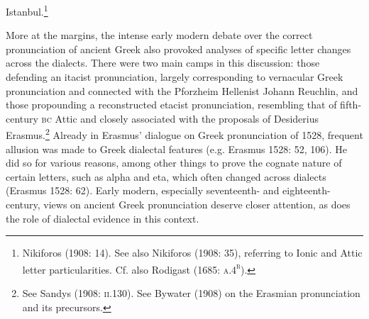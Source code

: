 \documentclass[12pt]{article}
\newenvironment{styleStandard}{\renewcommand\baselinestretch{1.25}\setlength\leftskip{0in}\setlength\rightskip{0in}\setlength\parindent{0.1972in}\setlength\parfillskip{0pt plus 1fil}\setlength\parskip{0in plus 1pt}\writerlistparindent\writerlistleftskip\leavevmode\normalfont\normalsize\writerlistlabel\ignorespaces}{\unskip\vspace{0in plus 1pt}\par}
\newcommand\writerlistleftskip{}
\newcommand\writerlistparindent{}
\newcommand\writerlistlabel{}
\begin{document}
\begin{styleStandard}
Istanbul.\footnote{\textrm{ Nikiforos (1908: 14). See also Nikiforos (1908: 35), referring to Ionic and Attic letter particularities. Cf. }also Rodigast (1685: \textsc{a.4}\textsc{\textsuperscript{r}}).}
\end{styleStandard}

\begin{styleStandard}
More at the margins, the intense early modern debate over the correct pronunciation of ancient Greek also provoked analyses of specific letter changes across the dialects. There were two main camps in this discussion: those defending an itacist pronunciation, largely corresponding to vernacular Greek pronunciation and connected with the Pforzheim Hellenist Johann Reuchlin, and those propounding a reconstructed etacist pronunciation, resembling that of fifth-century \textsc{bc} Attic and closely associated with the proposals of Desiderius Erasmus.\footnote{ See Sandys (1908: \textsc{ii.}130). See Bywater (1908) on the Erasmian pronunciation and its precursors.} Already in Erasmus’ dialogue on Greek pronunciation of 1528, frequent allusion was made to Greek dialectal features (e.g. Erasmus 1528: 52, 106). He did so for various reasons, among other things to prove the cognate nature of certain letters, such as alpha and eta, which often changed across dialects (Erasmus 1528: 62). Early modern, especially seventeenth- and eighteenth-century, views on ancient Greek pronunciation deserve closer attention, as does the role of dialectal evidence in this context.
\end{styleStandard}
\end{document}
